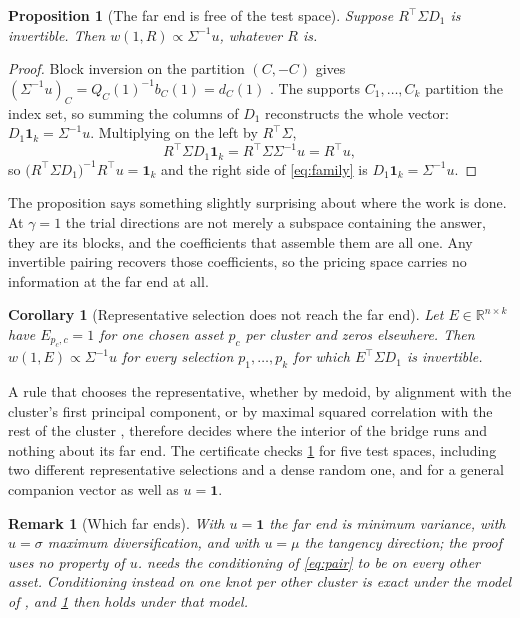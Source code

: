 \documentclass[11pt]{article}
\newcommand{\R}{\mathbb{R}}
\newcommand{\ones}{\mathbf{1}}
\newtheorem{proposition}{Proposition}
\newtheorem{corollary}{Corollary}
\newtheorem{remark}{Remark}
\begin{document}
\begin{proposition}[The far end is free of the test space]
\label{prop:far}
Suppose $R^\top\Sigma D_1$ is invertible. Then
$w(1,R)\propto\Sigma^{-1}u$, whatever $R$ is.
\end{proposition}

\begin{proof}
Block inversion on the partition $(C,-C)$ gives
$(\Sigma^{-1}u)_C=Q_C(1)^{-1}b_C(1)=d_C(1)$
\cite[App.~A]{cotton2024schur}. The supports $C_1,\dots,C_k$ partition the
index set, so summing the columns of $D_1$ reconstructs the whole vector:
$D_1\ones_k=\Sigma^{-1}u$. Multiplying on the left by $R^\top\Sigma$,
\[
  R^\top\Sigma D_1\ones_k=R^\top\Sigma\Sigma^{-1}u=R^\top u ,
\]
so $\big(R^\top\Sigma D_1\big)^{-1}R^\top u=\ones_k$ and the right side of
\eqref{eq:family} is $D_1\ones_k=\Sigma^{-1}u$.
\end{proof}

The proposition says something slightly surprising about where the work is
done. At $\gamma=1$ the trial directions are not merely a subspace containing
the answer, they are its blocks, and the coefficients that assemble them are all
one. Any invertible pairing recovers those coefficients, so the pricing space
carries no information at the far end at all.

\begin{corollary}[Representative selection does not reach the far end]
\label{cor:rep}
Let $E\in\R^{n\times k}$ have $E_{p_c,c}=1$ for one chosen asset $p_c$ per
cluster and zeros elsewhere. Then $w(1,E)\propto\Sigma^{-1}u$ for every
selection $p_1,\dots,p_k$ for which $E^\top\Sigma D_1$ is invertible.
\end{corollary}

A rule that chooses the representative, whether by medoid, by alignment with the
cluster's first principal component, or by maximal squared correlation with the
rest of the cluster \cite{bajo2026}, therefore decides where the interior of the
bridge runs and nothing about its far end. The certificate checks
\cref{prop:far} for five test spaces, including two different representative
selections and a dense random one, and for a general companion vector as well as
$u=\ones$.

\begin{remark}[Which far ends]
With $u=\ones$ the far end is minimum variance, with $u=\sigma$ maximum
diversification, and with $u=\mu$ the tangency direction; the proof uses no
property of $u$.  needs the conditioning of \eqref{eq:pair} to be
on every other asset. Conditioning instead on one knot per other cluster is
exact under the model of \cite{cotton2026nco}, and \cref{prop:far} then holds
under that model.
\end{remark}
\end{document}
